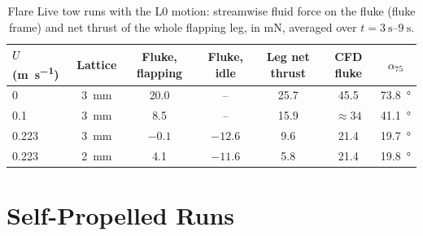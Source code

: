 \begin{table}[H]
  \centering
  \caption[Flare Live tow runs]{Flare Live tow runs with the L0 motion: streamwise fluid force on the fluke (fluke frame) and net
    thrust of the whole flapping leg, in \si{\milli\newton}, averaged over $t=\SIrange{3}{9}{\second}$.}
  \label{tab:app-flare}
  \footnotesize
  \begin{tabular}{@{}lcccccc@{}}
    \toprule
    $U$ (\si{\metre\per\second}) & Lattice & Fluke, flapping & Fluke, idle & Leg net thrust & CFD fluke & $\alpha_{75}$ \\
    \midrule
    0     & \SI{3}{\milli\metre} & 20.0  & --      & 25.7 & 45.5 & \SI{73.8}{\degree} \\
    0.1   & \SI{3}{\milli\metre} & 8.5   & --      & 15.9 & $\approx34$ & \SI{41.1}{\degree} \\
    0.223 & \SI{3}{\milli\metre} & $-0.1$ & $-12.6$ & 9.6  & 21.4 & \SI{19.7}{\degree} \\
    0.223 & \SI{2}{\milli\metre} & 4.1   & $-11.6$ & 5.8  & 21.4 & \SI{19.8}{\degree} \\
    \bottomrule
  \end{tabular}
\end{table}

\section{Self-Propelled Runs}

